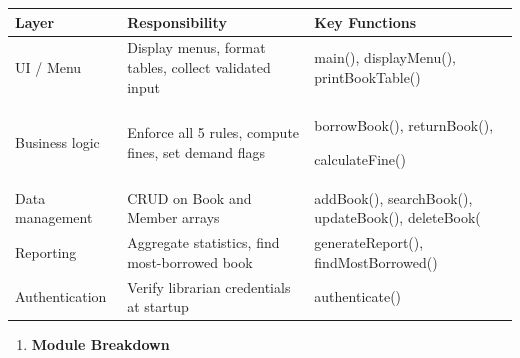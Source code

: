 \documentclass[
]{article}
\newcounter{none} %
\begin{document}
{\def\LTcaptype{none} %
\begin{longtable}[]{@{}
  >{\raggedright\arraybackslash}p{}
  >{\raggedright\arraybackslash}p{}
  >{\raggedright\arraybackslash}p{}@{}}
\toprule\noalign{}
\begin{minipage}[b]{\linewidth}\raggedright
Layer
\end{minipage} & \begin{minipage}[b]{\linewidth}\raggedright
Responsibility
\end{minipage} & \begin{minipage}[b]{\linewidth}\raggedright
Key Functions
\end{minipage} \\
\midrule\noalign{}
\endhead
\bottomrule\noalign{}
\endlastfoot
UI / Menu & Display menus, format tables, collect validated input &
main(), displayMenu(), printBookTable() \\
Business logic & Enforce all 5 rules, compute fines, set demand flags &
borrowBook(), returnBook(),

calculateFine() \\
Data management & CRUD on Book and Member arrays & addBook(),
searchBook(), updateBook(), deleteBook( \\
Reporting & Aggregate statistics, find most-borrowed book &
generateReport(), findMostBorrowed() \\
Authentication & Verify librarian credentials at startup &
authenticate() \\
\end{longtable}
}

\begin{enumerate}
\def\labelenumi{\alph{enumi})}
\setcounter{enumi}{2}
\item
  \textbf{Module Breakdown}
\end{enumerate}
\end{document}
